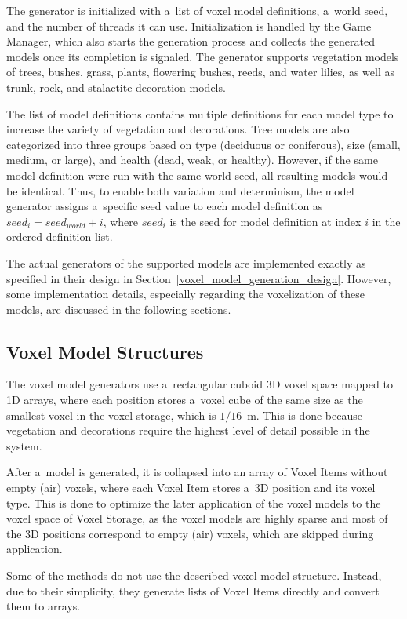 The generator is initialized with a~list of voxel model definitions, a~world seed, and the number of threads it can use. Initialization is handled by the Game Manager, which also starts the generation process and collects the generated models once its completion is signaled. The generator supports vegetation models of trees, bushes, grass, plants, flowering bushes, reeds, and water lilies, as well as trunk, rock, and stalactite decoration models.

The list of model definitions contains multiple definitions for each model type to increase the variety of vegetation and decorations. Tree models are also categorized into three groups based on type (deciduous or coniferous), size (small, medium, or large), and health (dead, weak, or healthy). However, if the same model definition were run with the same world seed, all resulting models would be identical. Thus, to enable both variation and determinism, the model generator assigns a~specific seed value to each model definition as $seed_i = seed_{world} + i$, where $seed_i$ is the seed for model definition at index $i$ in the ordered definition list.

The actual generators of the supported models are implemented exactly as specified in their design in Section~\ref{voxel_model_generation_design}. However, some implementation details, especially regarding the voxelization of these models, are discussed in the following sections.

\subsection{Voxel Model Structures}

The voxel model generators use a~rectangular cuboid 3D voxel space mapped to 1D arrays, where each position stores a~voxel cube of the same size as the smallest voxel in the voxel storage, which is $1/16$~m. This is done because vegetation and decorations require the highest level of detail possible in the system.

After a~model is generated, it is collapsed into an array of Voxel Items without empty (air) voxels, where each Voxel Item stores a~3D position and its voxel type. This is done to optimize the later application of the voxel models to the voxel space of Voxel Storage, as the voxel models are highly sparse and most of the 3D positions correspond to empty (air) voxels, which are skipped during application.

Some of the methods do not use the described voxel model structure. Instead, due to their simplicity, they generate lists of Voxel Items directly and convert them to arrays.

